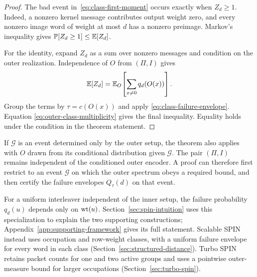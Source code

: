 \begin{proof}
The bad event in~\eqref{eq:class-first-moment} occurs exactly when
$Z_d\ge1$. Indeed, a nonzero kernel message contributes output weight zero,
and every nonzero image word of weight at most $d$ has a nonzero preimage.
Markov's inequality gives $\mathbb P[Z_d\ge1]\le\mathbb E[Z_d]$.

For the identity, expand $Z_d$ as a sum over nonzero messages and condition
on the outer realization. Independence of $O$ from $(\Pi,I)$ gives
\[
  \mathbb E[Z_d]
  =
  \mathbb E_O\!\left[
    \sum_{x\ne0}q_d(O(x))
  \right].
\]
Group the terms by $\tau=c(O(x))$ and apply
\eqref{eq:class-failure-envelope}. Equation
\eqref{eq:outer-class-multiplicity} gives the final inequality. Equality holds
under the condition in the theorem statement.
\end{proof}

If $\mathcal G$ is an event determined only by the outer setup, the theorem
also applies with $O$ drawn from its conditional distribution given
$\mathcal G$. The pair $(\Pi,I)$ remains independent of the conditioned outer
encoder. A proof can therefore first restrict to an event $\mathcal G$ on which
the outer spectrum obeys a required bound, and then certify the failure
envelopes $Q_\tau(d)$ on that event.

For a uniform interleaver independent of the inner setup, the failure
probability $q_d(u)$ depends only on $\operatorname{wt}(u)$. Section~\ref{sec:spin-intuition}
uses this specialization to explain the two supporting constructions;
Appendix~\ref{app:supporting-framework} gives its full statement.
Scalable SPIN instead uses occupation and row-weight classes, with a
uniform failure envelope for every word in each class
(Section~\ref{sec:structured-distance}).
Turbo SPIN retains packet counts for one and two active groups and uses a
pointwise outer-measure bound for larger occupations
(Section~\ref{sec:turbo-spin}).
